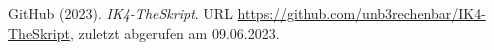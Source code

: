 \documentclass[../main.tex]{subfiles}
\begin{document}
\begin{thebibliography}{99}
		 GitHub (2023). \emph{IK4-TheSkript}. URL \url{https://github.com/unb3rechenbar/IK4-TheSkript}, zuletzt abgerufen am 09.06.2023.
	

	\end{thebibliography}
\end{document}
